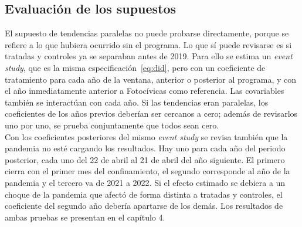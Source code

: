 \subsection{Evaluación de los supuestos}
\noindent El supuesto de tendencias paralelas no puede probarse directamente, porque se refiere a lo que hubiera ocurrido sin el programa. Lo que sí puede revisarse es si tratadas y controles ya se separaban antes de 2019. Para ello se estima un \emph{event study}, que es la misma especificación~\eqref{eq:did}, pero con un coeficiente de tratamiento para cada año de la ventana, anterior o posterior al programa, y con el año inmediatamente anterior a Fotocívicas como referencia. Las covariables también se interactúan con cada año. Si las tendencias eran paralelas, los coeficientes de los años previos deberían ser cercanos a cero; además de revisarlos uno por uno, se prueba conjuntamente que todos sean cero.\\

Con los coeficientes posteriores del mismo \emph{event study} se revisa también que la pandemia no esté cargando los resultados. Hay uno para cada año del periodo posterior, cada uno del 22 de abril al 21 de abril del año siguiente. El primero cierra con el primer mes del confinamiento, el segundo corresponde al año de la pandemia y el tercero va de 2021 a 2022. Si el efecto estimado se debiera a un choque de la pandemia que afectó de forma distinta a tratadas y controles, el coeficiente del segundo año debería apartarse de los demás. Los resultados de ambas pruebas se presentan en el capítulo 4.
